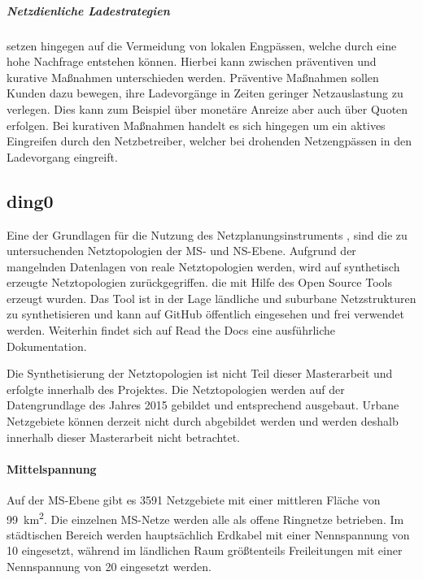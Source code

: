 \subparagraph{Netzdienliche Ladestrategien} setzen hingegen auf die Vermeidung von lokalen Engpässen, welche durch eine hohe Nachfrage entstehen können. Hierbei kann zwischen präventiven und kurative Maßnahmen unterschieden werden. Präventive Maßnahmen sollen Kunden dazu bewegen, ihre Ladevorgänge in Zeiten geringer Netzauslastung zu verlegen. Dies kann zum Beispiel über monetäre Anreize aber auch über Quoten erfolgen. Bei kurativen Maßnahmen handelt es sich hingegen um ein aktives Eingreifen durch den Netzbetreiber, welcher bei drohenden Netzengpässen in den Ladevorgang eingreift. \cite{Agora2019}


\subsection{ding0}\label{chap:dingo_theo}

Eine der Grundlagen für die Nutzung des Netzplanungsinstruments \edisgodot, sind die zu untersuchenden Netztopologien der \gls{MS}- und \gls{NS}-Ebene.
Aufgrund der mangelnden Datenlagen von reale Netztopologien werden, wird auf synthetisch erzeugte Netztopologien zurückgegriffen.
die mit Hilfe des Open Source Tools \dingo erzeugt wurden.
Das Tool ist in der Lage ländliche und suburbane Netzstrukturen zu synthetisieren und kann auf GitHub \cite{dingo2019} öffentlich eingesehen und frei verwendet werden.
Weiterhin findet sich auf Read the Docs \cite{dingo-docs2019} eine ausführliche Dokumentation.\medskip

Die Synthetisierung der Netztopologien ist nicht Teil dieser Masterarbeit und erfolgte innerhalb des \openego Projektes. \cite{Mueller2019}
Die Netztopologien werden auf der Datengrundlage des Jahres \num{2015} gebildet und entsprechend ausgebaut.
Urbane Netzgebiete können derzeit nicht durch \dingo abgebildet werden und werden deshalb innerhalb dieser Masterarbeit nicht betrachtet.


\paragraph{Mittelspannung}

Auf der \gls{MS}-Ebene gibt es \num{3591} Netzgebiete mit einer mittleren Fläche von \SI{99}{\km\squared}.
Die einzelnen \gls{MS}-Netze werden alle als offene Ringnetze betrieben.
Im städtischen Bereich werden hauptsächlich Erdkabel mit einer Nennspannung von \SI{10}{\kv} eingesetzt, während im ländlichen Raum größtenteils Freileitungen mit einer Nennspannung von \SI{20}{\kv} eingesetzt werden. \cite{Mueller2019}\medskip

